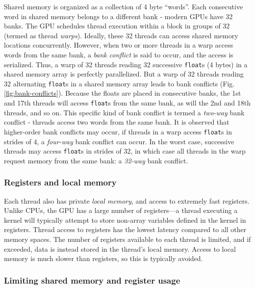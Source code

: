 Shared memory is organized as a collection of  4 byte ``words''.
Each consecutive word in shared memory belongs
to a different bank - modern GPUs have 32 banks.
The GPU schedules
thread execution within a block
in groups of 32 (termed as thread \emph{warps}).
Ideally, these 32 threads
can access shared memory locations concurrently.
However, when two or more threads in a warp access
words from the same bank,
a \emph{bank conflict} is said to occur,
and the access is serialized.
Thus,
a warp of 32 threads reading
32 successive \texttt{float}s (4 bytes) in a shared memory array
is perfectly parallelized.
But a warp of 32 threads reading
32 alternating \texttt{float}s in a shared memory array
leads to bank conflicts (Fig. \ref{fig:bank-conflicts}).
Because the floats are placed in consecutive banks,
the 1st and 17th threads will access \texttt{float}s from the same bank,
as will the 2nd and 18th threads, and so on.
This specific kind of bank conflict is termed a
\emph{two-way} bank conflict -
threads access two words from the same bank.
It is observed that higher-order bank conflicts may occur,
if threads in a warp access
\texttt{float}s in strides of 4,
a \emph{four-way} bank conflict can occur.
In the worst case, successive threads may access
\texttt{float}s in strides of 32,
in which case all threads in the warp
request memory from the same bank:
a \emph{32-way} bank conflict.

\subsubsection{Registers and local memory}

Each thread also has private \emph{local memory},
and access to extremely fast registers.
Unlike CPUs, the GPU has a large number of registers---a
thread executing a kernel will
typically attempt to store
non-array variables defined in the kernel in registers.
Thread access to registers has the lowest latency
compared to all other memory spaces.
The number of registers available to each thread is limited,
and if exceeded,
data is instead stored in the thread's local memory.
Access to local memory is much slower than registers,
so this is typically avoided.

\subsubsection{Limiting shared memory and register usage}

